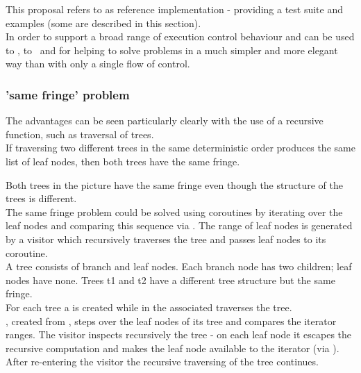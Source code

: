 
This proposal refers to \boostcoroutine as reference implementation - providing
a test suite and examples (some are described in this section).\\
\newline
In order to support a broad range of execution control behaviour \pushcoro and
\pullcoro can be used to \escrecloops, to \escreccomps~and for \coopmultitasking
helping to solve problems in a much simpler and more elegant way than with only
a single flow of control.\\

\subsubsection*{'same fringe' problem}
The advantages can be seen particularly clearly with the use of a recursive
function, such as traversal of trees.\\
If traversing two different trees in the same deterministic order produces the
same list of leaf nodes, then both trees have the same fringe.\\


Both trees in the picture have the same fringe even though the structure of the
trees is different.\\
\newline
The same fringe problem could be solved using coroutines by iterating over the
leaf nodes and comparing this sequence via . The range of leaf
nodes is generated by a visitor which recursively traverses the tree and passes
leaf nodes to its coroutine.\\
\newline
{}
A tree consists of branch and leaf nodes. Each branch node has two children;
leaf nodes have none. Trees t1 and t2 have a different tree structure but the
same fringe.\\
For each tree a \pullcoro is created while in the associated \corofunction
{} traverses the tree.\\
\pullcoroiterator, created from \pullcoro, steps over the leaf nodes of its tree
and  compares the iterator ranges.
\newline
\newline
{}
The visitor inspects recursively the tree - on each leaf node it escapes the
recursive computation and makes the leaf node available to the iterator (via
\pushcoro). After re-entering the visitor the recursive traversing of the tree
continues.
